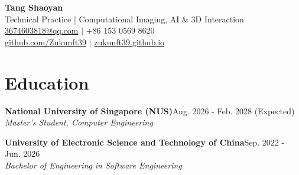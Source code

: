 \documentclass[a4paper,11pt]{article}
\newcommand{\resumeSubheading}[3]{\textbf{#1}\hfill{\small #3}\\{\small\textit{#2}}\par\vspace{3pt}}
\begin{document}
\begin{center}
{\Huge\bfseries Tang Shaoyan}\\[3pt]
{\small Technical Practice | Computational Imaging, AI \& 3D Interaction}\\[3pt]
{\small \href{mailto:3674603818@qq.com}{3674603818@qq.com} $|$ +86 153 0569 8620}\\[2pt]
{\small \href{https://github.com/Zukunft39}{github.com/Zukunft39} $|$ \href{https://zukunft39.github.io}{zukunft39.github.io}}
\end{center}\vspace{-6pt}
\section{Education}
\resumeSubheading{National University of Singapore (NUS)}{Master's Student, Computer Engineering}{Aug. 2026 - Feb. 2028 (Expected)}
\resumeSubheading{University of Electronic Science and Technology of China}{Bachelor of Engineering in Software Engineering}{Sep. 2022 - Jun. 2026}
\end{document}
